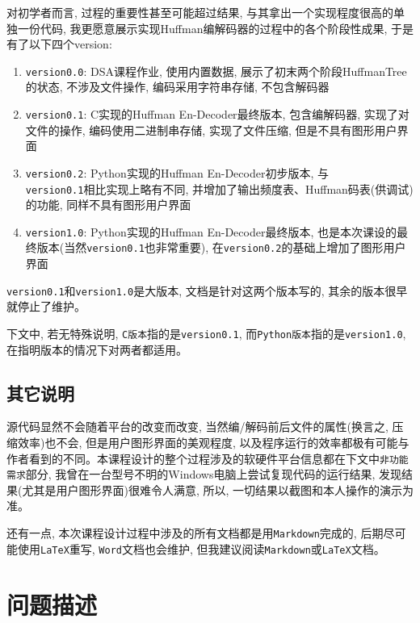 \documentclass{ctexart}
\begin{document}
对初学者而言, 过程的重要性甚至可能超过结果, 与其拿出一个实现程度很高的单独一份代码, 我更愿意展示实现Huffman编解码器的过程中的各个阶段性成果, 于是有了以下四个version:

\begin{enumerate}
\def\labelenumi{\arabic{enumi}.}
\item
  \texttt{version0.0}: DSA课程作业, 使用内置数据, 展示了初末两个阶段HuffmanTree的状态, 不涉及文件操作, 编码采用字符串存储, 不包含解码器
\item
  \texttt{version0.1}: C实现的Huffman En-Decoder最终版本, 包含编解码器, 实现了对文件的操作, 编码使用二进制串存储, 实现了文件压缩, 但是不具有图形用户界面
\item
  \texttt{version0.2}: Python实现的Huffman En-Decoder初步版本, 与\\\texttt{version0.1}相比实现上略有不同, 并增加了输出频度表、Huffman码表(供调试)的功能, 同样不具有图形用户界面
\item
  \texttt{version1.0}: Python实现的Huffman En-Decoder最终版本, 也是本次课设的最终版本(当然\texttt{version0.1}也非常重要), 在\texttt{version0.2}的基础上增加了图形用户界面
\end{enumerate}

\texttt{version0.1}和\texttt{version1.0}是大版本, 文档是针对这两个版本写的, 其余的版本很早就停止了维护。

下文中, 若无特殊说明, \texttt{C版本}指的是\texttt{version0.1}, 而\texttt{Python版本}指的是\texttt{version1.0}, 在指明版本的情况下对两者都适用。

\subsection{其它说明}\label{header-n26}

源代码显然不会随着平台的改变而改变, 当然编/解码前后文件的属性(换言之, 压缩效率)也不会, 但是用户图形界面的美观程度, 以及程序运行的效率都极有可能与作者看到的不同。本课程设计的整个过程涉及的软硬件平台信息都在下文中\texttt{非功能需求}部分, 我曾在一台型号不明的Windows电脑上尝试复现代码的运行结果,
发现结果(尤其是用户图形界面)很难令人满意, 所以, 一切结果以截图和本人操作的演示为准。

还有一点, 本次课程设计过程中涉及的所有文档都是用\texttt{Markdown}完成的, 后期尽可能使用\texttt{LaTeX}重写, \texttt{Word}文档也会维护, 但我建议阅读\texttt{Markdown}或\texttt{LaTeX}文档。


\section{问题描述}\label{header-n29}
\end{document}
